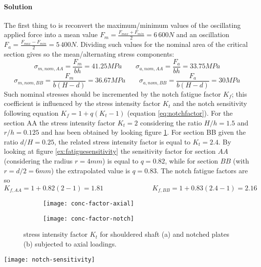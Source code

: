 	\paragraph{Solution} The first thing to is reconvert the maximum/minimum values of the oscillating applied force into a mean value $F_m = \frac{F_{max}+F_{min}}{2} = 6\,600N$ and an oscillation $F_a = \frac{F_{max} - F_{min}}{2} = 5\,400N$. Dividing such values for the nominal area of the critical section gives so the mean/alternating stress components:
	\[ \sigma_{m,nom,AA} = \frac{F_m}{bh} = 41.25 MPa \qquad \sigma_{a,nom,AA} = \frac{F_a}{bh} = 33.75 MPa \] \[ \sigma_{m,nom,BB} = \frac{F_m}{b(H-d)} = 36.67 MPa \qquad \sigma_{a,nom,BB} = \frac{F_a}{b(H-d)} = 30 MPa \]
	Such nominal stresses should be incremented by the notch fatigue factor $K_f$; this coefficient is influenced by the stress intensity factor $K_t$ and the notch sensitivity following equation $K_f = 1 + q(K_t-1)$ (equation \ref{eq:notchfactor}). For the section AA the stress intensity factor $K_t = 2 $ considering the ratio $H/h = 1.5$ and $r/h = 0.125$ and has been obtained by looking figure \ref{ex:fatiguekt}. For section BB given the ratio $d/H = 0.25$, the related stress intensity factor is equal to $K_t = 2.4$. By looking at figure \ref{ex:fatiguesensitivity} the sensitivity factor for section $AA$ (considering the radius $r=4mm$) is equal to $q = 0.82$, while for section $BB$ (with $r=d/2=6mm$) the extrapolated value is $q = 0.83$. The notch fatigue factors are so
	\[ K_{f,AA} = 1 + 0.82(2-1) = 1.81 \hspace{3cm} K_{f,BB} = 1 + 0.83(2.4-1) = 2.16 \]
	
	\begin{figure}[bt]
		\centering 
		\begin{subfigure}{0.48\linewidth}
			\centering \texttt{[image: conc-factor-axial]} \caption{}
		\end{subfigure}
		\begin{subfigure}{0.48\linewidth}
			\centering \texttt{[image: conc-factor-notch]} \caption{}
		\end{subfigure}
		\caption{stress intensity factor $K_t$ for shouldered shaft (a) and notched plates (b) subjected to axial loadings.} \label{ex:fatiguekt}
	\end{figure}
	
	\begin{SCfigure}[1][bt]
		\centering \texttt{[image: notch-sensitivity]}
		\caption{notch sensitivity.} \label{ex:fatiguesensitivity}
	\end{SCfigure}
	
